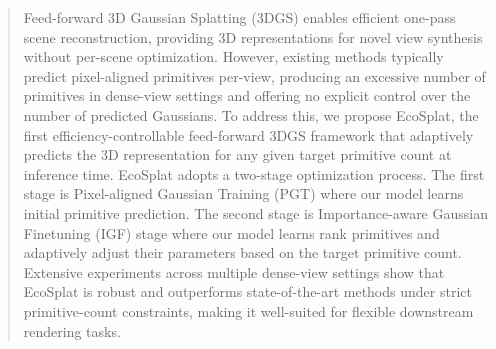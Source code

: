 \begin{abstract}
Feed-forward 3D Gaussian Splatting (3DGS) enables efficient one-pass scene reconstruction, providing 3D representations for novel view synthesis without per-scene optimization. However, existing methods typically predict pixel-aligned primitives per-view, producing an excessive number of primitives in dense-view settings and offering no explicit control over the number of predicted Gaussians. To address this, we propose EcoSplat, the first efficiency-controllable feed-forward 3DGS framework that adaptively predicts the 3D representation for any given target primitive count at inference time. EcoSplat adopts a two-stage optimization process. The first stage is Pixel-aligned Gaussian Training (PGT) where our model learns initial primitive prediction. The second stage is Importance-aware Gaussian Finetuning (IGF) stage where our model learns rank primitives and adaptively adjust their parameters based on the target primitive count. Extensive experiments across multiple dense-view settings show that EcoSplat is robust and outperforms state-of-the-art methods under strict primitive-count constraints, making it well-suited for flexible downstream rendering tasks.

\end{abstract}